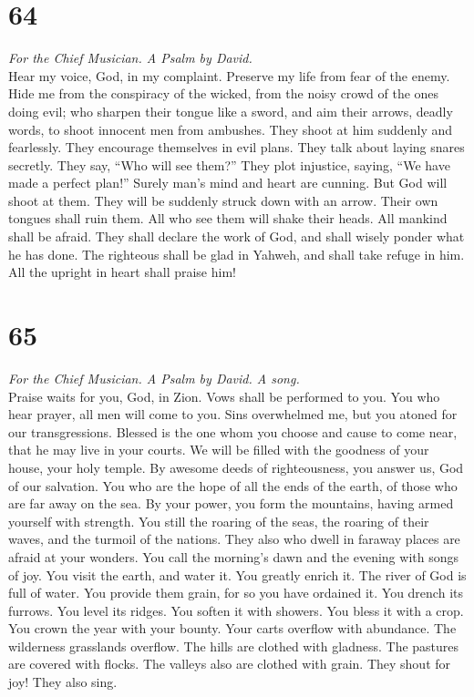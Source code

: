 \hypertarget{section-63}{%
\section{64}\label{section-63}}

\emph{For the Chief Musician. A Psalm by David.}\\
 Hear my voice, God, in my complaint. Preserve my life
from fear of the enemy.  Hide me from the conspiracy of
the wicked, from the noisy crowd of the ones doing evil; 
who sharpen their tongue like a sword, and aim their arrows, deadly
words,  to shoot innocent men from ambushes. They shoot at
him suddenly and fearlessly.  They encourage themselves in
evil plans. They talk about laying snares secretly. They say, ``Who will
see them?''  They plot injustice, saying, ``We have made a
perfect plan!'' Surely man's mind and heart are cunning. 
But God will shoot at them. They will be suddenly struck down with an
arrow.  Their own tongues shall ruin them. All who see
them will shake their heads.  All mankind shall be afraid.
They shall declare the work of God, and shall wisely ponder what he has
done.  The righteous shall be glad in Yahweh, and shall
take refuge in him. All the upright in heart shall praise him!

\hypertarget{section-64}{%
\section{65}\label{section-64}}

\emph{For the Chief Musician. A Psalm by David. A song.}\\
 Praise waits for you, God, in Zion. Vows shall be
performed to you.  You who hear prayer, all men will come
to you.  Sins overwhelmed me, but you atoned for our
transgressions.  Blessed is the one whom you choose and
cause to come near, that he may live in your courts. We will be filled
with the goodness of your house, your holy temple.  By
awesome deeds of righteousness, you answer us, God of our salvation. You
who are the hope of all the ends of the earth, of those who are far away
on the sea.  By your power, you form the mountains, having
armed yourself with strength.  You still the roaring of
the seas, the roaring of their waves, and the turmoil of the nations.
 They also who dwell in faraway places are afraid at your
wonders. You call the morning's dawn and the evening with songs of joy.
 You visit the earth, and water it. You greatly enrich it.
The river of God is full of water. You provide them grain, for so you
have ordained it.  You drench its furrows. You level its
ridges. You soften it with showers. You bless it with a crop.
 You crown the year with your bounty. Your carts overflow
with abundance.  The wilderness grasslands overflow. The
hills are clothed with gladness.  The pastures are
covered with flocks. The valleys also are clothed with grain. They shout
for joy! They also sing.

